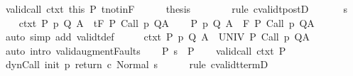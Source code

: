 \begin{isabellebody}
\ valid{\isacharunderscore}call\ ctxt\ this\ P\ t{\isacharunderscore}notin{\isacharunderscore}F\isanewline
\ \ \ \ \isamarkupfalse%
\ {\isacharquery}thesis\isanewline
\ \ \ \ \ \ \isamarkupfalse%
\ {\isacharparenleft}rule\ cvalidt{\isacharunderscore}postD{\isacharparenright}\isanewline
\ \ \isamarkupfalse%
\isanewline
{}\isamarkupfalse%
\isanewline
\ \ \isamarkupfalse%
\ s\isanewline
\ \ \isamarkupfalse%
\ ctxt{\isacharcolon}\ {\isachardoublequoteopen}{\isasymforall}{\isacharparenleft}P{\isacharcomma}\ p{\isacharcomma}\ Q{\isacharcomma}\ A{\isacharparenright}{\isasymin}{\isasymTheta}{\isachardot}\ {\isasymGamma}\ {\isasymTurnstile}\isactrlsub t\isactrlbsub {\isacharslash}F\isactrlesub \ P\ {\isacharparenleft}Call\ p{\isacharparenright}\ Q{\isacharcomma}A{\isachardoublequoteclose}\isanewline
\ \ \isamarkupfalse%
\ {\isachardoublequoteopen}{\isasymforall}{\isacharparenleft}P{\isacharcomma}\ p{\isacharcomma}\ Q{\isacharcomma}\ A{\isacharparenright}{\isasymin}{\isasymTheta}{\isachardot}\ {\isasymGamma}\ {\isasymTurnstile}\isactrlbsub {\isacharslash}F\isactrlesub \ P\ {\isacharparenleft}Call\ p{\isacharparenright}\ Q{\isacharcomma}A{\isachardoublequoteclose}\ \isanewline
\ \ \ \ \isamarkupfalse%
\ {\isacharparenleft}auto\ simp\ add{\isacharcolon}\ validt{\isacharunderscore}def{\isacharparenright}\isanewline
\ \ \isamarkupfalse%
\ \isamarkupfalse%
\ ctxt{\isacharprime}{\isacharcolon}\ {\isachardoublequoteopen}{\isasymforall}{\isacharparenleft}P{\isacharcomma}\ p{\isacharcomma}\ Q{\isacharcomma}\ A{\isacharparenright}{\isasymin}{\isasymTheta}{\isachardot}\ {\isasymGamma}\ {\isasymTurnstile}\isactrlbsub {\isacharslash}UNIV\isactrlesub \ P\ {\isacharparenleft}Call\ p{\isacharparenright}\ Q{\isacharcomma}A{\isachardoublequoteclose}\isanewline
\ \ \ \ \isamarkupfalse%
\ {\isacharparenleft}auto\ intro{\isacharcolon}\ valid{\isacharunderscore}augment{\isacharunderscore}Faults{\isacharparenright}\isanewline
\ \ \isamarkupfalse%
\ P{\isacharcolon}\ {\isachardoublequoteopen}s\ {\isasymin}\ P{\isachardoublequoteclose}\isanewline
\ \ \isamarkupfalse%
\ valid{\isacharunderscore}call\ ctxt\ P\isanewline
\ \ \isamarkupfalse%
\ {\isachardoublequoteopen}{\isasymGamma}{\isasymturnstile}dynCall\ init\ p\ return{\isacharprime}\ c{\isasymdown}\ Normal\ s{\isachardoublequoteclose}\isanewline
\ \ \ \ \isamarkupfalse%
\ {\isacharparenleft}rule\ cvalidt{\isacharunderscore}termD{\isacharparenright}\isanewline

\end{isabellebody}

